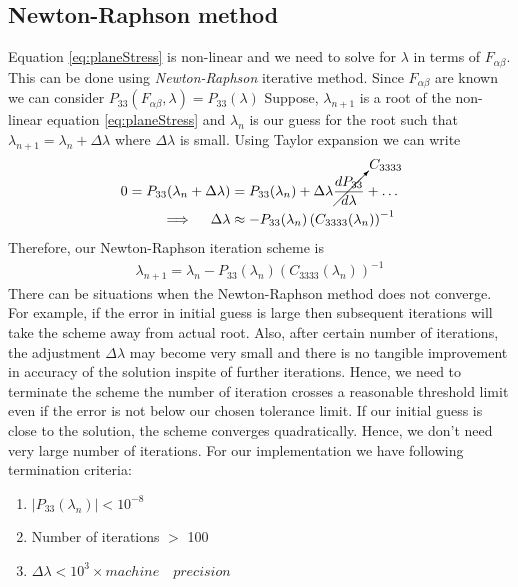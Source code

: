 \message{ !name(p2.tex)}\documentclass[../main.tex]{subfiles}
\begin{document}
\subsection{Newton-Raphson method}
\label{sec:NR}
Equation \ref{eq:planeStress} is non-linear and we need to solve for
$\lambda$ in terms of $F_{\alpha\beta}$. This can be done using
\textit{Newton-Raphson} iterative method. Since $F_{\alpha\beta}$ are
known we can consider $P_{33}(F_{\alpha\beta},\lambda) =
P_{33}(\lambda)$ Suppose, $\lambda_{n+1}$ is a root of the non-linear
equation \ref{eq:planeStress} and $\lambda_{n}$ is our guess for the
root such that $\lambda_{n+1}=\lambda_{n}+\Delta\lambda$ where
$\Delta\lambda$ is small. Using Taylor expansion we can write
\begin{align*}
  0 = P_{33}(\lambda_n+\Delta\lambda) &=P_{33}(\lambda_n) + \Delta\lambda\cancelto{C_{3333}}{\frac{dP_{33}}{d\lambda}} + \ldots\\
  \implies \quad \Delta\lambda &\approx -P_{33}(\lambda_n)\left(C_{3333}(\lambda_n)\right)^{-1}
\end{align*}
Therefore, our Newton-Raphson iteration scheme is 
\begin{align}
  \boxed{\lambda_{n+1} = \lambda_n- P_{33}(\lambda_n)\left(C_{3333}(\lambda_n)\right)^{-1}}
\end{align}
There can be situations when the Newton-Raphson method does not
converge. For example, if the error in initial guess is large then
subsequent iterations will take the scheme away from actual
root. Also, after certain number of iterations, the adjustment
$\Delta\lambda$ may become very small and there is no tangible
improvement in accuracy of the solution inspite of further
iterations. Hence, we need to terminate the scheme the number of
iteration crosses a reasonable threshold limit even if the error is
not below our chosen tolerance limit. If our initial guess is close to
the solution, the scheme converges quadratically. Hence, we don't need
very large number of iterations. For our implementation we have
following termination criteria:
\begin{enumerate}
\item $|P_{33}(\lambda_n)| < 10^{-8}$
\item Number of iterations $>$ 100
\item $\Delta\lambda < 10^3\times machine\quad precision$
\end{enumerate}
\end{document}
